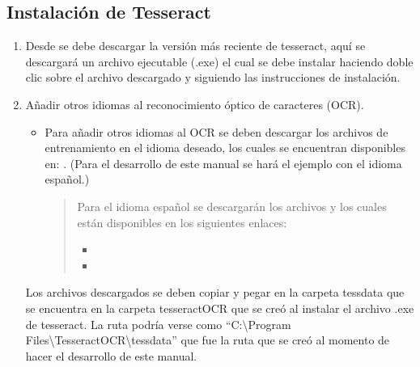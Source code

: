 \documentclass[letterpaper,10pt,openany,spanish]{sphinxmanual}
\begin{document}
\subsection{Instalación de Tesseract}
\label{\detokenize{instalacion/instalacion_popple_teseract:instalacion-de-tesseract}}\begin{enumerate}
%
\item {} 
Desde  se debe descargar la versión más reciente de tesseract, aquí se descargará un archivo ejecutable (.exe) el cual se debe instalar haciendo doble clic sobre el archivo descargado y siguiendo las instrucciones de instalación.

\item {} 
Añadir otros idiomas al reconocimiento óptico de caracteres (OCR).
\begin{itemize}
\item {} 
Para añadir otros idiomas al OCR se deben descargar los archivos de entrenamiento en el idioma deseado, los cuales se encuentran disponibles en:   . (Para el desarrollo de este manual se hará el ejemplo con el idioma español.)
\begin{quote}

Para el idioma español se descargarán los archivos  y  los cuales están disponibles en los siguientes enlaces:
\begin{itemize}
\item {} 

\item {} 

\end{itemize}
\end{quote}

\end{itemize}

Los archivos descargados se deben copiar y pegar en la carpeta tessdata que se encuentra en la carpeta tesseract\sphinxhyphen{}OCR que se creó al instalar el archivo .exe de tesseract. La ruta podría verse como “C:\textbackslash{}Program Files\textbackslash{}Tesseract\sphinxhyphen{}OCR\textbackslash{}tessdata” que fue la ruta que se creó al momento de hacer el desarrollo de este manual.


\end{enumerate}
\end{document}
